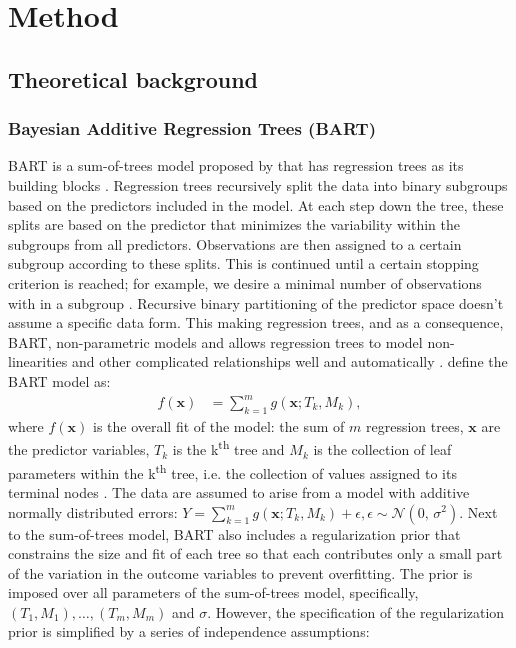 \documentclass[10pt, a4paper, titlepage]{article}
\begin{document}
\section{Method}
\subsection{Theoretical background}
\subsubsection{Bayesian Additive Regression Trees (BART)}
BART is a sum-of-trees model proposed by \citet{chipman2010} that has regression trees as its building blocks \citep{chipman2010, hill2020, james2021}. Regression trees recursively split the data into binary subgroups based on the predictors included in the model. At each step down the tree, these splits are based on the predictor that minimizes the variability within the subgroups from all predictors. Observations are then assigned to a certain subgroup according to these splits. This is continued until a certain stopping criterion is reached; for example, we desire a minimal number of observations with in a subgroup \citep{hastie2017, james2021, salditt2023, breiman1984}. Recursive binary partitioning of the predictor space doesn't assume a specific data form. This making regression trees, and as a consequence, BART, non-parametric models \citep{hastie2017, james2021, salditt2023, breiman1984} and allows regression trees to model non-linearities and other complicated relationships well and automatically \citep{hill2020, burgette2010}.
\citet{chipman2010} define the BART model as:
\begin{align}
\label{eq:BART}
f(\textbf{x}) &= \sum^{m}_{k=1}g(\textbf{x}; T_{k}, M_{k}),
\end{align} where $f(\mathbf{x})$ is the overall fit of the model: the sum of $m$ regression trees, $\textbf{x}$ are the predictor variables, $T_{k}$ is the k\textsuperscript{th} tree and $M_{k}$ is the collection of leaf parameters within the k\textsuperscript{th} tree, i.e. the collection of values assigned to its terminal nodes \citep{chipman1998, chipman2006, chipman2010, hill2020, james2021}. The data are assumed to arise from a model with additive normally distributed errors: $Y = \sum^{m}_{k=1}g(\textbf{x}; T_{k}, M_{k}) + \epsilon, \epsilon \sim \mathcal{N}(0,\,\sigma^{2})$.
Next to the sum-of-trees model, BART also includes a regularization prior that constrains the size and fit of each tree so that each contributes only a small part of the variation in the outcome variables to prevent overfitting. The prior is imposed over all parameters of the sum-of-trees model, specifically, $(T_1, M_1), \dots, (T_m, M_m)$ and $\sigma$. However, the specification of the regularization prior is simplified by a series of independence assumptions: 
\end{document}
